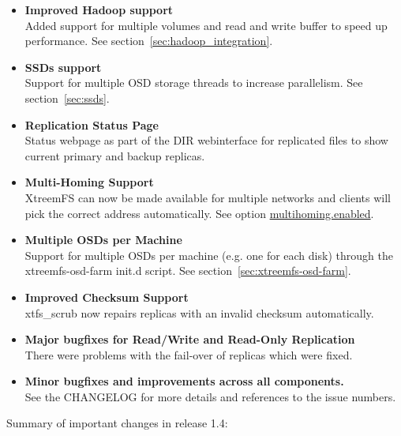 \documentclass[a4paper,10pt]{book}
\begin{document}
\begin{itemize}
 \item \textbf{Improved Hadoop support}\\
    Added support for multiple volumes and read and write buffer to speed up performance. See section~\ref{sec:hadoop_integration}.
 \item \textbf{SSDs support}\\
    Support for multiple OSD storage threads to increase parallelism. See section~\ref{sec:ssds}.
 \item \textbf{Replication Status Page}\\
    Status webpage as part of the DIR webinterface for replicated files to show current primary and backup replicas.
 \item \textbf{Multi-Homing Support}\\
    XtreemFS can now be made available for multiple networks and clients will pick the correct address automatically. See option \hyperref[option:multihoming.enabled]{multihoming.enabled}.
 \item \textbf{Multiple OSDs per Machine}\\
    Support for multiple OSDs per machine (e.g. one for each disk) through the xtreemfs-osd-farm init.d script. See section~\ref{sec:xtreemfs-osd-farm}.
 \item \textbf{Improved Checksum Support}\\
    xtfs\_scrub now repairs replicas with an invalid checksum automatically.
 \item \textbf{Major bugfixes for Read/Write and Read-Only Replication}\\
    There were problems with the fail-over of replicas which were fixed.
 \item \textbf{Minor bugfixes and improvements across all components.}\\
    See the CHANGELOG for more details and references to the issue numbers.
\end{itemize}

Summary of important changes in release 1.4:
\end{document}
